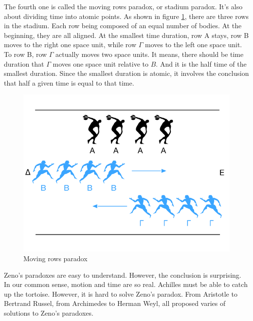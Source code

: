 \documentclass{article}
\begin{document}
The fourth one is called the moving rows paradox, or stadium paradox. It's also about dividing time into atomic points. As shown in figure \ref{fig:Moving-rows-paradox}, there are three rows in the stadium. Each row being composed of an equal number of bodies. At the beginning, they are all aligned. At the smallest time duration, row A stays, row B moves to the right one space unit, while row $\Gamma$ moves to the left one space unit. To row B, row $\Gamma$ actually moves two space units. It means, there should be time duration that $\Gamma$ moves one space unit relative to $B$. And it is the half time of the smallest duration. Since the smallest duration is atomic, it involves the conclusion that half a given time is equal to that time.

\begin{figure}[htbp]
 \centering
 \includegraphics[scale=0.3]{img/Moving-rows-paradox.png}
 \caption{Moving rows paradox}
 \label{fig:Moving-rows-paradox}
\end{figure}

Zeno's paradoxes are easy to understand. However, the conclusion is surprising. In our common sense, motion and time are so real. Achilles must be able to catch up the tortoise. However, it is hard to solve Zeno's paradox. From Aristotle to Bertrand Russel, from Archimedes to Herman Weyl, all proposed varies of solutions to Zeno's paradoxes\cite{Wikipedia-Zeno}.
\end{document}
